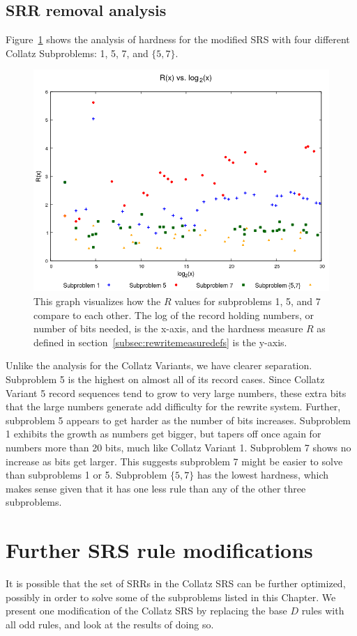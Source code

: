\subsection{SRR removal analysis} \label{subsec:rewritehardness}
Figure~\ref{fig:rvslog} shows the analysis of hardness for the modified SRS with four different Collatz Subproblems: 1, 5, 7, and $\{5,7\}$. 
\begin{figure}
    \centering
    \includegraphics[scale=0.75]{ModAvoidanceAnalysisPics/R_vs_log.png}
    \caption{This graph visualizes how the $R$ values for subproblems 1, 5, and 7 compare to each other. The log of the record holding numbers, or number of bits needed, is the x-axis, and the hardness measure $R$ as defined in section~\ref{subsec:rewritemeasuredefs} is the y-axis.}
    \label{fig:rvslog}
\end{figure}
Unlike the analysis for the Collatz Variants, we have clearer separation. Subproblem 5 is the highest on almost all of its record cases. Since Collatz Variant 5 record sequences tend to grow to very large numbers, these extra bits that the large numbers generate add difficulty for the rewrite system. Further, subproblem 5 appears to get harder as the number of bits increases. Subproblem 1 exhibits the growth as numbers get bigger, but tapers off once again for numbers more than 20 bits, much like Collatz Variant 1. Subproblem 7 shows no increase as bits get larger. This suggests subproblem 7 might be easier to solve than subproblems 1 or 5. Subproblem $\{5,7\}$ has the lowest hardness, which makes sense given that it has one less rule than any of the other three subproblems.
\section{Further SRS rule modifications}\label{subsec:srsrulemod}
It is possible that the set of SRRs in the Collatz SRS can be further optimized, possibly in order to solve some of the subproblems listed in this Chapter. We present one modification of the Collatz SRS by replacing the base $D$ rules with all odd rules, and look at the results of doing so.

